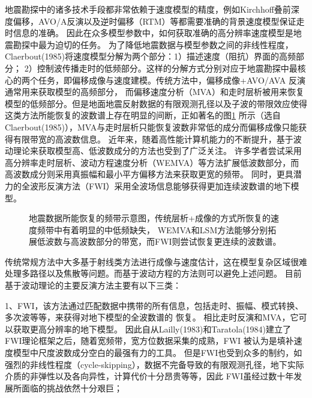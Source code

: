 地震勘探中的诸多技术手段都非常依赖于速度模型的精度，例如Kirchhoff叠前深度偏移，AVO/A反演以及逆时偏移（RTM）等都需要准确的背景速度模型保证走时信息的准确。
因此在众多模型参数中，如何获取准确的高分辨率速度模型是地震勘探中最为迫切的任务。
为了降低地震数据与模型参数之间的非线性程度，Claerbout(1985)\cite{Claerbout1985Imaging}将速度模型分解为两个部分：1）描述速度（阻抗）界面的高频部分；
2）控制波传播走时的低频部分。这样的分解方式分别对应于地震勘探中最核心的两个任务，即偏移成像与速度建模。传统方法中，偏移成像+AVO/AVA
反演通常用来获取模型的高频部分，
而偏移速度分析（MVA）和走时层析被用来恢复模型的低频部分。但是地面地震反射数据的有限观测孔径以及子波的带限效应使得
这类方法所能恢复的波数谱上存在明显的间断，正如著名的图\ref{fig:GapInSeisVel}
所示（选自Claerbout(1985)\cite{Claerbout1985Imaging}），MVA与走时层析只能恢复波数非常低的成分而偏移成像只能获得有限带宽的高波数信息。
近年来，随着高性能计算机能力的不断提升，基于波动理论来获取模型高、低波数成分的方法也受到了广泛关注。
许多学者尝试采用高分辨率走时层析、波动方程速度分析（WEMVA）等方法扩展低波数部分，而高波数成分则采用真振幅和最小平方偏移方法来获取更宽的频带。
同时，更具潜力的全波形反演方法（FWI）采用全波场信息能够获得更加连续波数谱的地下模型。
\begin{figure}[!htb] 
   \centering 
   \caption{地震数据所能恢复的频带示意图，传统层析+成像的方式所恢复的速度频带中有着明显的中低频缺失，
   WEMVA和LSM方法能够分别拓展低波数与高波数部分的带宽，而FWI则尝试恢复更连续的波数谱。}
   \label{fig:GapInSeisVel}
\end{figure}

传统常规方法中大多基于射线类方法进行成像与速度估计，这在模型复杂区域很难处理多路径以及焦散等问题。而基于波动方程的方法则可以避免上述问题。
目前基于波动理论的主要反演方法主要有以下三类：

1、FWI，该方法通过匹配数据中携带的所有信息，包括走时、振幅、模式转换、多次波等等，来获得对地下模型的全波数谱的
恢复。
相比走时反演和MVA，它可以获取更高分辨率的地下模型。
因此自从Lailly(1983)\cite{lailly1983seismic}和Taratola(1984)\cite{tarantola1984}建立了FWI理论框架之后，随着宽频带，宽方位数据采集的成熟，FWI
被认为是填补速度模型中尺度波数成分空白的最强有力的工具。
但是FWI也受到众多的制约，如强烈的非线性程度（cycle-skipping），数据不完备导致的有限观测孔径，地下实际介质的非弹性以及各向异性，计算代价十分昂贵等等，因此
FWI虽经过数十年发展所面临的挑战依然十分艰巨；

